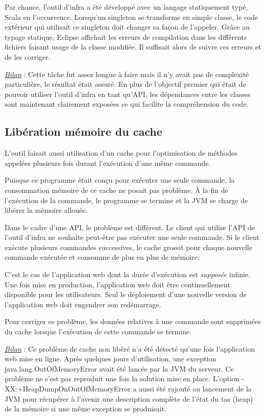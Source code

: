 Par chance, l'outil d'infra a été développé avec un langage statiquement
typé, Scala en l’occurrence.
Lorsqu'un singleton se transforme en simple classe, le code extérieur qui
utilisait ce singleton doit changer sa façon de l'appeler.
Grâce au typage statique, Eclipse affichait les erreurs de compilation dans
les différents fichiers faisant usage de la classe modifiée. Il suffisait alors
de suivre ces erreurs et de les corriger.

\underline{\textit{Bilan}} : Cette tâche fut assez longue à faire mais il n'y
avait pas de complexité particulière, le résultat était assuré.
En plus de l'objectif premier qui était de pouvoir utiliser l'outil d'infra en
tant qu'API, les dépendances entre les classes sont maintenant clairement
exposées ce qui facilite la compréhension du code.

\subsection{Libération mémoire du cache}

L'outil faisait aussi utilisation d'un cache pour l'optimisation de méthodes
appelées plusieurs fois durant l'exécution d'une même commande.

Puisque ce programme était conçu pour exécuter une seule commande, la
consommation mémoire de ce cache ne posait pas problème.
À la fin de l'exécution de la commande, le programme se termine et la JVM
se charge de libérer la mémoire allouée.

Dans le cadre d'une API, le problème est différent. Le client qui utilise l'API
de l'outil d'infra ne souhaite peut-être pas exécuter une seule commande.
Si le client exécute plusieurs commandes successives, le cache grossit pour
chaque nouvelle commande exécutée et consomme de plus en plus de mémoire.

C'est le cas de l'application web dont la durée d'exécution est \textit{supposée}
infinie. Une fois mise en production, l'application web doit être
continuellement disponible pour les utilisateurs. Seul le déploiement d'une
nouvelle version de l'application web doit engendrer son redémarrage.

Pour corriger ce problème, les données relatives à une commande sont supprimées
du cache lorsque l'exécution de cette commande se termine.

\underline{\textit{Bilan}} : Ce problème de cache non libéré n'a été détecté
qu'une fois l'application web mise en ligne. Après quelques jours
d'utilisation, une exception java.lang.OutOfMemoryError avait été lancée par la
JVM du serveur. Ce problème ne s'est pas reproduit une fois la solution mise en
place. L'option -XX:+HeapDumpOnOutOfMemoryError a aussi été rajouté au lancement
de la JVM pour récupérer à l'avenir une description complète de l'état du tas
(heap) de la mémoire si une même exception se produisait.

